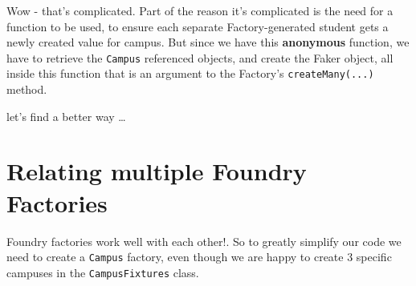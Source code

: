\documentclass[a4paperpaper,openright]{book}
\newenvironment{Shaded}{}{}
\newcommand{\BuiltInTok}[1]{#1}
\newcommand{\ExtensionTok}[1]{#1}
\newcommand{\FunctionTok}[1]{\textcolor[rgb]{0.02,0.16,0.49}{#1}}
\newcommand{\KeywordTok}[1]{\textcolor[rgb]{0.00,0.44,0.13}{\textbf{#1}}}
\newcommand{\NormalTok}[1]{#1}
\newcommand{\OperatorTok}[1]{\textcolor[rgb]{0.40,0.40,0.40}{#1}}
\newcommand{\StringTok}[1]{\textcolor[rgb]{0.25,0.44,0.63}{#1}}
\newcommand{\VariableTok}[1]{\textcolor[rgb]{0.10,0.09,0.49}{#1}}
\begin{document}
\begin{Shaded}
\end{Shaded}

Wow - that's complicated. Part of the reason it's complicated is the
need for a function to be used, to ensure each separate
Factory-generated student gets a newly created value for campus. But
since we have this \textbf{anonymous} function, we have to retrieve the
\texttt{Campus} referenced objects, and create the Faker object, all
inside this function that is an argument to the Factory's
\texttt{createMany(...)} method.

let's find a better way \ldots{}

\hypertarget{relating-multiple-foundry-factories}{%
\section{Relating multiple Foundry
Factories}\label{relating-multiple-foundry-factories}}

Foundry factories work well with each other!. So to greatly simplify our
code we need to create a \texttt{Campus} factory, even though we are
happy to create 3 specific campuses in the \texttt{CampusFixtures}
class.
\end{document}
